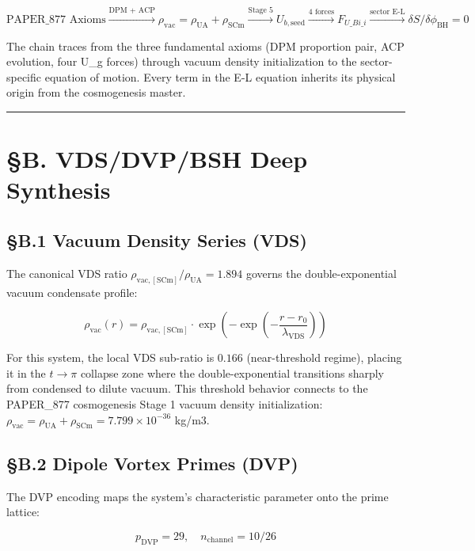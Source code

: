 \documentclass[12pt,a4paper]{article}
\begin{document}
\begin{equation}
\text{PAPER\_877 Axioms} \xrightarrow{\text{DPM + ACP}} \rho_{\mathrm{vac}} = \rho_{\mathrm{UA}} + \rho_{\mathrm{SCm}} \xrightarrow{\text{Stage 5}} U_{b,\mathrm{seed}} \xrightarrow{\text{4 forces}} F_{U\_Bi\_i} \xrightarrow{\text{sector E-L}} \delta S/\delta \phi_{\mathrm{BH}} = 0
\end{equation}

The chain traces from the three fundamental axioms (DPM proportion pair, ACP evolution, four U\_g forces) through vacuum density initialization to the sector-specific equation of motion. Every term in the E-L equation inherits its physical origin from the cosmogenesis master.

\medskip\hrule\medskip

\section{\S{}B. VDS/DVP/BSH Deep Synthesis}

\subsection{\S{}B.1 Vacuum Density Series (VDS)}

The canonical VDS ratio $\rho_{\mathrm{vac,[SCm]}} / \rho_{\mathrm{UA}} = 1.894$ governs the double-exponential vacuum condensate profile:

\begin{equation}
\rho_{\mathrm{vac}}(r) = \rho_{\mathrm{vac,[SCm]}} \cdot \exp\!\left(-\exp\!\left(-\frac{r - r_0}{\lambda_{\mathrm{VDS}}}\right)\right)
\end{equation}

For this system, the local VDS sub-ratio is $0.166$ (near-threshold regime), placing it in the $t \to \pi$ collapse zone where the double-exponential transitions sharply from condensed to dilute vacuum. This threshold behavior connects to the PAPER\_877 cosmogenesis Stage 1 vacuum density initialization: $\rho_{\mathrm{vac}} = \rho_{\mathrm{UA}} + \rho_{\mathrm{SCm}} = 7.799 \times 10^{-36}$ kg/m3.

\subsection{\S{}B.2 Dipole Vortex Primes (DVP)}

The DVP encoding maps the system's characteristic parameter onto the prime lattice:

\begin{equation}
p_{\mathrm{DVP}} = 29, \quad n_{\mathrm{channel}} = 10/26
\end{equation}
\end{document}
